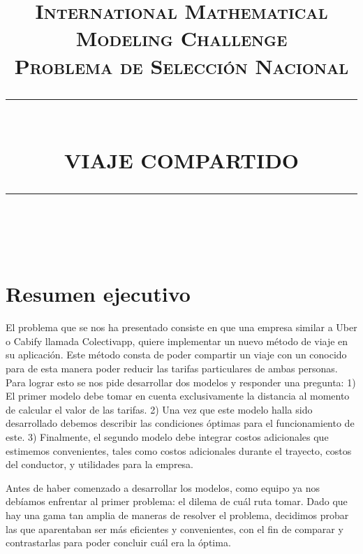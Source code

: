 \documentclass[12pt]{report}
\newcommand{\HRule}[1]{\rule{\linewidth}{#1}}
\begin{document}
\title{ \normalsize \textsc{International Mathematical Modeling Challenge \\ Problema de Selección Nacional}
		\\ [2.0cm]
		\HRule{0.5pt} \\ [0.5cm]
		\LARGE \textbf{\uppercase{Viaje Compartido}}
		\HRule{2pt} \\}


\maketitle
\tableofcontents
\newpage

\sectionfont{\scshape}


\newpage
\section*{Resumen ejecutivo}
El problema que se nos ha presentado consiste en que una empresa similar a Uber o Cabify llamada Colectivapp, quiere implementar un nuevo método de viaje en su aplicación. Este método consta de poder compartir un viaje con un conocido para de esta manera poder reducir las tarifas particulares de ambas personas. Para lograr esto se nos pide desarrollar dos modelos y responder una pregunta: 1) El primer modelo debe tomar en cuenta exclusivamente la distancia al momento de calcular el valor de las tarifas. 2) Una vez que este modelo halla sido desarrollado debemos describir las condiciones óptimas para el funcionamiento de este. 3) Finalmente, el segundo modelo debe integrar costos adicionales que estimemos convenientes, tales como costos adicionales durante el trayecto, costos del conductor, y utilidades para la empresa.

Antes de haber comenzado a desarrollar los modelos, como equipo ya nos debíamos enfrentar al primer problema: el dilema de cuál ruta tomar. Dado que hay una gama tan amplia de maneras de resolver el problema, decidimos probar las que aparentaban ser más eficientes y convenientes, con el fin de comparar y contrastarlas para poder concluir cuál era la óptima.
\end{document}
